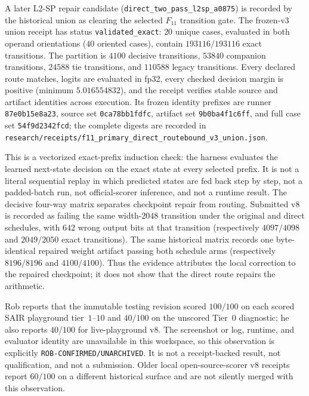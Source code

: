 \documentclass[11pt]{article}
\begin{document}
A later L2-SP repair candidate
(\nolinkurl{direct_two_pass_l2sp_a0875}) is recorded by the historical union as
clearing the selected $F_{11}$ transition gate. The frozen-v3 union receipt has status
\texttt{validated\_exact}: $20$ unique cases, evaluated in both operand
orientations ($40$ oriented cases), contain $193116/193116$ exact transitions.
The partition is $4100$ decisive transitions, $53840$ companion transitions,
$24588$ tie transitions, and $110588$ legacy transitions. Every declared route
matches, logits are evaluated in fp32, every checked decision margin is positive
(minimum $5.016554832$), and the receipt verifies stable source and artifact
identities across execution. Its frozen identity prefixes are runner
\texttt{87e0b15e8a23}, source set \texttt{0ca78bb1fdfc}, artifact set
\texttt{9b0ba4f1c6ff}, and full case set \texttt{54f9d2342fcd}; the complete
digests are recorded in
\nolinkurl{research/receipts/f11_primary_direct_routebound_v3_union.json}.

This is a vectorized exact-prefix induction check: the harness evaluates the
learned next-state decision on the exact state at every selected prefix. It is not
a literal sequential replay in which predicted states are fed back step by step,
not a padded-batch run, not official-scorer inference, and not a runtime result.
The decisive four-way matrix separates checkpoint repair from routing. Submitted
v8 is recorded as failing the same width-$2048$ transition under the original and direct schedules,
with $642$ wrong output bits at that transition (respectively $4097/4098$ and
$2049/2050$ exact transitions). The same historical matrix records one
byte-identical repaired weight artifact passing
both schedule arms (respectively $8196/8196$ and $4100/4100$). Thus the evidence
attributes the local correction to the repaired checkpoint; it does not show that
the direct route repairs the arithmetic.

Rob reports that the immutable testing revision scored $100/100$ on each scored
SAIR playground tier~$1$--$10$ and $40/100$ on the unscored Tier~$0$ diagnostic;
he also reports $40/100$ for live-playground v8. The screenshot or log, runtime,
and evaluator identity are unavailable in this workspace, so this observation is
explicitly \texttt{ROB-CONFIRMED/UNARCHIVED}. It is not a receipt-backed result,
not qualification, and not a submission. Older local open-source-scorer v8
receipts report $60/100$ on a different historical surface and are not silently
merged with this observation.
\end{document}
